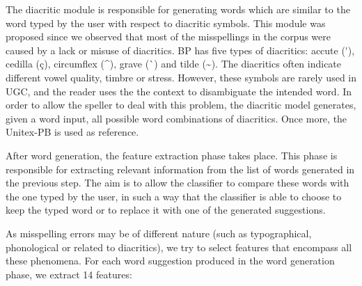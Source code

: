 The diacritic module is responsible for generating words which are similar to the word typed by the user with respect to diacritic symbols. This module was proposed since we observed that most of the misspellings in the corpus were caused by a lack or misuse of diacritics. BP has
five types of diacritics: accute (\'{}), cedilla (\c{c}), circumflex (\^{}), grave (\`{}) and tilde (\~{}). The diacritics often indicate different vowel quality, timbre or stress. However, these symbols are rarely used in UGC, and the reader uses the the context to  disambiguate the intended word. In order to allow the speller to deal with this problem, the diacritic model generates, given a word input, all possible word combinations of diacritics. Once more, the Unitex-PB is used as reference. 

After word generation, the feature extraction phase takes place. This phase is responsible  for extracting relevant information from the list of words generated in the previous step. The aim is to allow the classifier to compare these words with the one typed by the user, in such a way that the classifier is able to choose to keep the typed word or to replace it with one of the generated suggestions. 

As misspelling errors may be of different nature (such as typographical, phonological or related to diacritics), we try to select features that encompass all these phenomena. For each word suggestion produced in the word generation phase, we extract 14 features:

